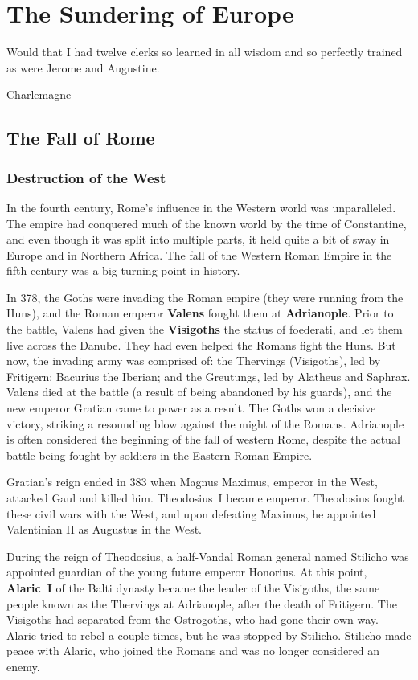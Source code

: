 \chapter{The Sundering of Europe}

\epigraph{%
  Would that I had twelve clerks so learned in all wisdom and so perfectly trained as were Jerome and Augustine.
}{Charlemagne}

\section{The Fall of Rome}

\subsection*{Destruction of the West}

In the fourth century, Rome's influence in the Western world was unparalleled.
The empire had conquered much of the known world by the time of Constantine,
and even though it was split into multiple parts, it held quite a bit of sway
in Europe and in Northern Africa.
The fall of the Western Roman Empire in the fifth century was a big turning point in history.

In 378, the Goths were invading the Roman empire (they were running from the Huns),
and the Roman emperor \textbf{Valens} fought them at \textbf{Adrianople}.
Prior to the battle, Valens had given the \textbf{Visigoths} the status of foederati, and let them live across the Danube.
They had even helped the Romans fight the Huns.
But now, the invading army was comprised of:
the Thervings (Visigoths), led by Fritigern;
Bacurius the Iberian;
and the Greutungs, led by Alatheus and Saphrax.
Valens died at the battle (a result of being abandoned by his guards),
and the new emperor Gratian came to power as a result.
The Goths won a decisive victory, striking a resounding blow against the might of the Romans.
Adrianople is often considered the beginning of the fall of western Rome,
despite the actual battle being fought by soldiers in the Eastern Roman Empire.

Gratian's reign ended in 383 when Magnus Maximus, emperor in the West, attacked Gaul and killed him.
Theodosius~I became emperor.
Theodosius fought these civil wars with the West,
and upon defeating Maximus, he appointed Valentinian II as Augustus in the West.

During the reign of Theodosius, a half-Vandal Roman general named Stilicho
was appointed guardian of the young future emperor Honorius.
At this point, \textbf{Alaric~I} of the Balti dynasty became the leader of the Visigoths,
the same people known as the Thervings at Adrianople, after the death of Fritigern.
The Visigoths had separated from the Ostrogoths, who had gone their own way.
Alaric tried to rebel a couple times, but he was stopped by Stilicho.
Stilicho made peace with Alaric, who joined the Romans and was no longer considered an enemy.

